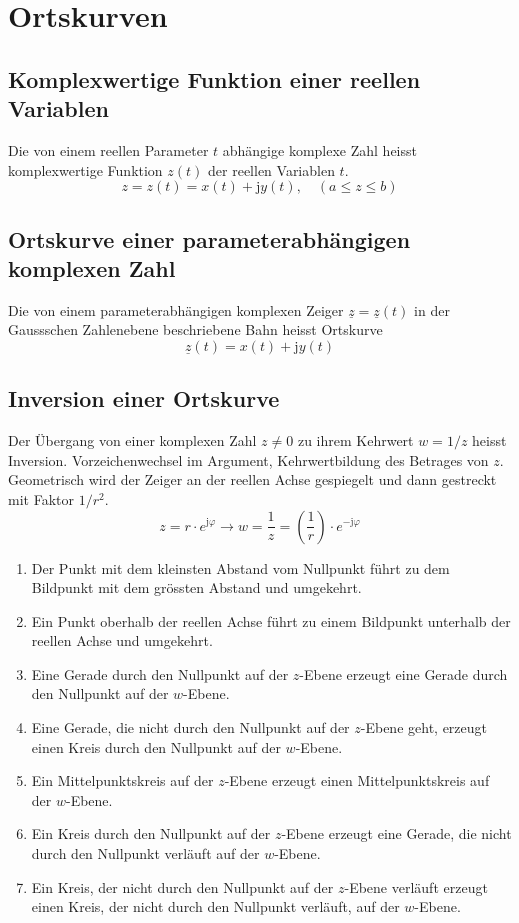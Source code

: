 \section{Ortskurven}
\subsection{Komplexwertige Funktion einer reellen Variablen}
Die von einem reellen Parameter $t$ abhängige komplexe Zahl heisst komplexwertige Funktion $z\left(t\right)$ der reellen Variablen $t$.
\begin{equation}
\boxed{z=z\left(t\right)=x\left(t\right)+\text{j}y\left(t\right),\quad \left(a\leq z\leq b\right)}
\end{equation}
\subsection{Ortskurve einer parameterabhängigen komplexen Zahl}
Die von einem parameterabhängigen komplexen Zeiger $\underline{z}=\underline{z}\left(t\right)$ in der Gaussschen Zahlenebene beschriebene Bahn heisst Ortskurve
\begin{equation}
\boxed{\underline{z}\left(t\right)=x\left(t\right)+\text{j}y\left(t\right)}
\end{equation}
\subsection{Inversion einer Ortskurve}
Der Übergang von einer komplexen Zahl $z\neq 0$ zu ihrem Kehrwert $w=1/z$ heisst Inversion. Vorzeichenwechsel im Argument, Kehrwertbildung des Betrages von $z$. Geometrisch wird der Zeiger an der reellen Achse gespiegelt und dann gestreckt mit Faktor $1/r^2$.
\begin{equation}
\boxed{z=r\cdot e^{\text{j}\varphi}\rightarrow w=\dfrac{1}{z}=\left(\dfrac{1}{r}\right)\cdot e^{-\text{j}\varphi}}
\end{equation}
\begin{enumerate}[$(i)$]
\item Der Punkt mit dem kleinsten Abstand vom Nullpunkt führt zu dem Bildpunkt mit dem grössten Abstand und umgekehrt.
\item Ein Punkt oberhalb der reellen Achse führt zu einem Bildpunkt unterhalb der reellen Achse und umgekehrt.
\item Eine Gerade durch den Nullpunkt auf der $z$-Ebene erzeugt eine Gerade durch den Nullpunkt auf der $w$-Ebene.
\item Eine Gerade, die nicht durch den Nullpunkt auf der $z$-Ebene geht, erzeugt einen Kreis durch den Nullpunkt auf der $w$-Ebene.
\item Ein Mittelpunktskreis auf der $z$-Ebene erzeugt einen Mittelpunktskreis auf der $w$-Ebene.
\item Ein Kreis durch den Nullpunkt auf der $z$-Ebene erzeugt eine Gerade, die nicht durch den Nullpunkt verläuft auf der $w$-Ebene.
\item Ein Kreis, der nicht durch den Nullpunkt auf der $z$-Ebene verläuft erzeugt einen Kreis, der nicht durch den Nullpunkt verläuft, auf der $w$-Ebene.
\end{enumerate}
